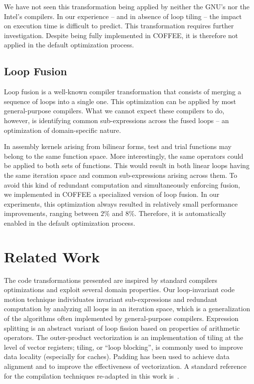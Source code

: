 We have not seen this transformation being applied by neither the GNU's nor the Intel's compilers. In our experience -- and in absence of loop tiling -- the impact on execution time is difficult to predict. This transformation requires further investigation. Despite being fully implemented in COFFEE, it is therefore not applied in the default optimization process.

\subsection{Loop Fusion}
\label{sec:coffee-loopfusion}
Loop fusion is a well-known compiler transformation that consists of merging a sequence of loops into a single one. This optimization can be applied by most general-purpose compilers. What we cannot expect these compilers to do, however, is identifying common sub-expressions across the fused loops -- an optimization of domain-specific nature.

In assembly kernels arising from bilinear forms, test and trial functions may belong to the same function space. More interestingly, the same operators could be applied to both sets of functions. This would result in both linear loops having the same iteration space and common sub-expressions arising across them. To avoid this kind of redundant computation and simultaneously enforcing fusion, we implemented in COFFEE a specialized version of loop fusion. In our experiments, this optimization always resulted in relatively small performance improvements, ranging between $2\%$ and $8\%$. Therefore, it is automatically enabled in the default optimization process.

\section{Related Work}
\label{sec:coffee-related-work}
The code transformations presented are inspired by standard compilers optimizations and exploit several domain properties. Our loop-invariant code motion technique individuates invariant sub-expressions and redundant computation by analyzing all loops in an iteration space, which is a generalization of the algorithms often implemented by general-purpose compilers. Expression splitting is an abstract variant of loop fission based on properties of arithmetic operators. The outer-product vectorization is an implementation of tiling at the level of vector registers; tiling, or ``loop blocking'', is commonly used to improve data locality (especially for caches). Padding has been used to achieve data alignment and to improve the effectiveness of vectorization. A standard reference for the compilation techniques re-adapted in this work is~\citep{dragonbook}.

